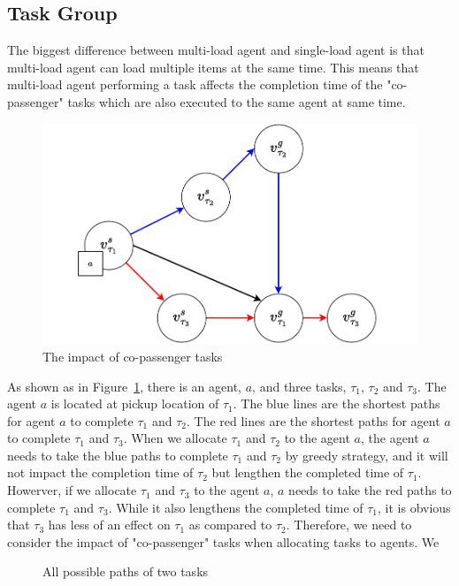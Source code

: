 \documentclass[sigconf,anonymous]{aamas}
\begin{document}
\subsection{Task Group}
The biggest difference between multi-load agent and single-load agent 
is that multi-load agent can load multiple items at the same time. 
This means that multi-load agent performing a task affects the completion time of the "co-passenger" tasks 
which are also executed to the same agent at same time.
\begin{figure}[ht]
  \centering
  \includegraphics[width=0.5\linewidth]{Fig/carpooling.pdf}
  \caption{The impact of co-passenger tasks}
  \label{fig:carpooling}
\end{figure}
As shown as in Figure~\ref{fig:carpooling}, there is an agent, $a$, 
and three tasks, $\tau_{1}$, $\tau_{2}$ and $\tau_{3}$.
The agent $a$ is located at pickup location of $\tau_{1}$.
The blue lines are the shortest paths for agent $a$ to complete $\tau_{1}$ and $\tau_{2}$.
The red lines are the shortest paths for agent $a$ to complete $\tau_{1}$ and $\tau_{3}$.
When we allocate $\tau_{1}$ and $\tau_{2}$ to the agent $a$,
the agent $a$ needs to take the blue paths to complete $\tau_{1}$ and $\tau_{2}$ by greedy strategy,
and it will not impact the completion time of $\tau_{2}$ but lengthen the completed time of $\tau_{1}$.
Howerver, if we allocate $\tau_{1}$ and $\tau_{3}$ to the agent $a$, 
$a$ needs to take the red paths to complete $\tau_{1}$ and $\tau_{3}$.
While it also lengthens the completed time of $\tau_{1}$, 
it is obvious that $\tau_3$ has less of an effect on $\tau_1$ as compared to $\tau_{2}$.
Therefore, we need to consider the impact of "co-passenger" tasks when allocating tasks to agents.
We 
\begin{figure}[htbp]
  \centering
  \caption{All possible paths of two tasks}
  \label{fig:2TP}
\end{figure}
\end{document}
